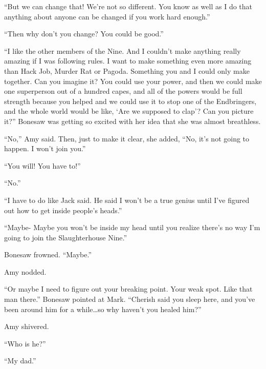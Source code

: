 ``But we can change that!  We're not so different.  You know as well as I do that anything about anyone can be changed if you work hard enough.''



``Then why don't you change?  You could be good.''



``I like the other members of the Nine.  And I couldn't make anything really amazing if I was following rules.  I want to make something even more amazing than Hack Job, Murder Rat or Pagoda.  Something you and I could only make together.  Can you imagine it?  You could use your power, and then we could make one superperson out of a hundred capes, and all of the powers would be full strength because you helped and we could use it to stop one of the Endbringers, and the whole world would be like, `Are we supposed to clap'?  Can you picture it?''  Bonesaw was getting so excited with her idea that she was almost breathless.



``No,'' Amy said.  Then, just to make it clear, she added, ``No, it's not going to happen.  I won't join you.''



``You will!  You have to!''



``No.''



``I have to do like Jack said.  He said I won't be a true genius until I've figured out how to get inside people's heads.''



``Maybe- Maybe you won't be inside my head until you realize there's no way I'm going to join the Slaughterhouse Nine.''



Bonesaw frowned.  ``Maybe.''



Amy nodded.



``Or maybe I need to figure out your breaking point.  Your weak spot.  Like that man there.''  Bonesaw pointed at Mark. ``Cherish said you sleep here, and you've been around him for a while\ldots so why haven't you healed him?''



Amy shivered.



``Who is he?''



``My dad.''



